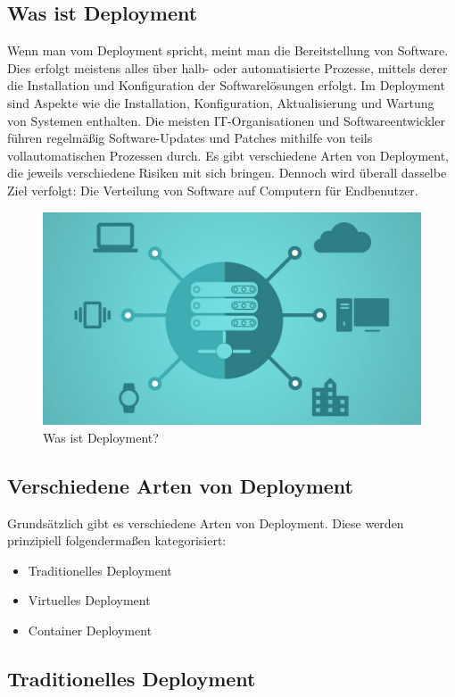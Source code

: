 \subsection{Was ist Deployment}

Wenn man vom Deployment spricht, meint man die Bereitstellung von Software. Dies erfolgt meistens alles über halb- oder automatisierte Prozesse, mittels derer die Installation und Konfiguration der Softwarelösungen erfolgt. Im Deployment sind Aspekte wie die Installation, Konfiguration, Aktualisierung und Wartung von Systemen enthalten.
Die meisten IT-Organisationen und Softwareentwickler führen regelmäßig Software-Updates und Patches mithilfe von teils vollautomatischen Prozessen durch. Es gibt verschiedene Arten von Deployment, die jeweils verschiedene Risiken mit sich bringen. Dennoch wird überall dasselbe Ziel verfolgt: Die Verteilung von Software auf Computern für Endbenutzer.

\begin{figure}[h!]
    \centering
    \includegraphics[width=0.8\linewidth]{pics/deployment.jpg}
    \caption{Was ist Deployment?}
    \label{fig:enter-label}
\end{figure}


\subsection{Verschiedene Arten von Deployment}

Grundsätzlich gibt es verschiedene Arten von Deployment. Diese werden prinzipiell folgendermaßen kategorisiert:
    \begin{itemize}
    \item Traditionelles Deployment
    \item Virtuelles Deployment
    \item Container Deployment
    \end{itemize}

\subsection{Traditionelles Deployment}

